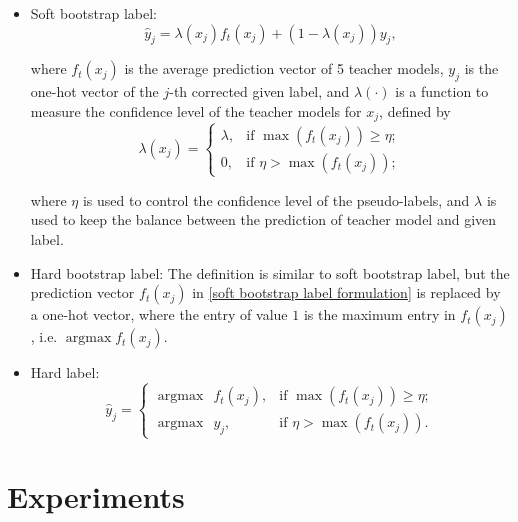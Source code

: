 \documentclass[conference]{IEEEtran}
\begin{document}
\begin{itemize}
\item Soft bootstrap label:
\vspace*{-0.4em}
\begin{equation}
\label{soft bootstrap label formulation}
\hat{y}_j=\lambda(x_j)f_t(x_j)+(1-\lambda(x_j))y_j,
\end{equation}
\vspace*{-1.5em}

\noindent where $f_t(x_j)$ is the average prediction vector of 5 teacher models, $y_j$ is the one-hot vector of the $j$-th corrected given label, and $\lambda(\cdot)$ is a function to measure the confidence level of the teacher models for $x_j$, defined by
\vspace*{-0.7em}
\begin{equation}
\label{casewise parameter}
\lambda(x_j) =
\begin{cases}
\lambda, &\mbox{if } \max(f_t(x_j))\geq\eta; \\
0, & \mbox{if } \eta > \max(f_t(x_j));
\end{cases}
\end{equation}
\vspace*{-0.9em}

\noindent where $\eta$ is used to control the confidence level of the pseudo-labels, and $\lambda$ is used to keep the balance between the prediction of teacher model and given label. 

\item Hard bootstrap label: The definition is similar to soft bootstrap label, but the prediction vector $f_t(x_j)$ in \eqref{soft bootstrap label formulation} is replaced by a one-hot vector, where the entry of value $1$ is the maximum entry in $f_t(x_j)$, i.e. $\operatorname{argmax} f_t(x_j)$.

\item Hard label: 
\vspace*{-0.1em}
\begin{equation}
\label{hard label formulation}
\hat{y}_j =
\begin{cases}
\operatorname{argmax} \ \ f_t(x_j), &\mbox{if } \max(f_t(x_j))\geq\eta; \\
\operatorname{argmax} \ \ y_j, & \mbox{if } \eta > \max(f_t(x_j)).
\end{cases}
\end{equation}
\end{itemize}


\section{Experiments}
\end{document}
